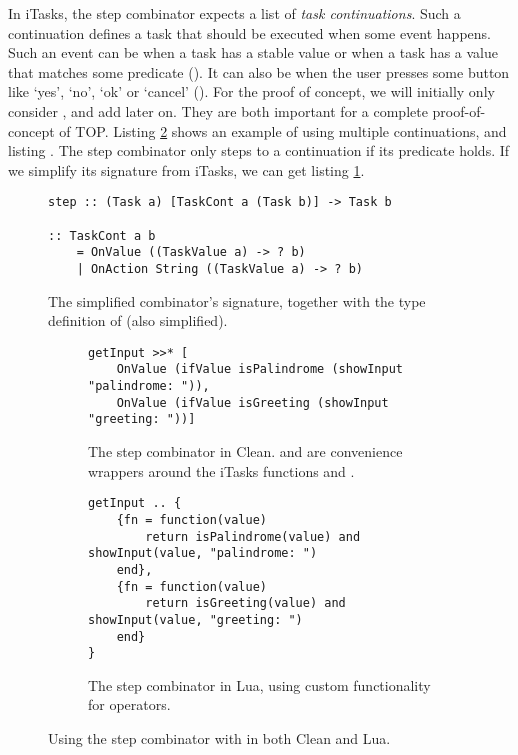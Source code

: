In iTasks, the step combinator expects a list of \textit{task continuations}. Such a continuation defines a task that should be executed when some event happens. Such an event can be when a task has a stable value or when a task has a value that matches some predicate (). It can also be when the user presses some button like `yes', `no', `ok' or `cancel' (). For the proof of concept, we will initially only consider , and add  later on. They are both important for a complete proof-of-concept of TOP. Listing \ref{lst:clean_onvalue_step} shows an example of using multiple  continuations, and listing . The step combinator only steps to a continuation if its predicate holds. If we simplify its signature from iTasks, we can get listing \ref{lst:clean_step}.

\begin{figure}[ht]
\centering
\begin{verbatim}
step :: (Task a) [TaskCont a (Task b)] -> Task b

:: TaskCont a b
    = OnValue ((TaskValue a) -> ? b)
    | OnAction String ((TaskValue a) -> ? b)
\end{verbatim}
\caption{The simplified  combinator's signature, together with the type definition of  (also simplified).}
\label{lst:clean_step}
\end{figure}

\begin{figure}[ht]
\begin{subfigure}{\textwidth}
\centering
\begin{verbatim}
getInput >>* [
    OnValue (ifValue isPalindrome (showInput "palindrome: ")),
    OnValue (ifValue isGreeting (showInput "greeting: "))]
\end{verbatim}
\caption{The step combinator in Clean.  and  are convenience wrappers around the iTasks functions  and .}
\label{lst:clean_onvalue_step}
\end{subfigure}
\begin{subfigure}{\textwidth}
\centering
\medskip %
\begin{verbatim}
getInput .. {
    {fn = function(value)
        return isPalindrome(value) and showInput(value, "palindrome: ")
    end},
    {fn = function(value)
        return isGreeting(value) and showInput(value, "greeting: ")
    end}
}
\end{verbatim}
\caption{The step combinator in Lua, using custom functionality for operators.}
\label{lst:lua_onvalue_step}
\end{subfigure}
\caption{Using the step combinator with  in both Clean and Lua.}
\end{figure}

